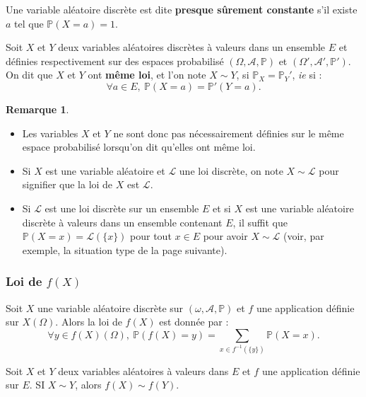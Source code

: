 \documentclass[french]{article}
\renewcommand{\P}{\mathbb{P}}
\newcommand{\inv}{^{-1}}
\theoremstyle{plain}
\theoremstyle{definition}
\newtheorem*{rmq}{Remarque}
\theoremstyle{remark}
\begin{document}
\begin{dfn}
	Une variable aléatoire discrète est dite \textbf{presque sûrement constante} s'il existe $a$ tel que $\P(X=a)=1$.
\end{dfn}

\begin{dfn}
	Soit $X$ et $Y$ deux variables aléatoires discrètes à valeurs dans un ensemble $E$ et définies respectivement sur des espaces probabilisé $(\Omega,\mathcal{A},\P)$ et $(\Omega',\mathcal{A}',\P')$.\\
	On dit que $X$ et $Y$ ont \textbf{même loi}, et l'on note $X\sim Y$, si $\P_X=\P_Y'$, \textit{ie} si :
	$$\forall a\in E,\ \P(X=a)=\P'(Y=a).$$
\end{dfn}

\begin{rmq}
	\begin{itemize}
		\item Les variables $X$ et $Y$ ne sont donc pas nécessairement définies sur le même espace probabilisé lorsqu'on dit qu'elles ont même loi.
		\item Si $X$ est une variable aléatoire et $\mathcal{L}$ une loi discrète, on note $X\sim\mathcal{L}$ pour signifier que la loi de $X$ est $\mathcal{L}$.
		\item Si $\mathcal{L}$ est une loi discrète sur un ensemble $E$ et si $X$ est une variable aléatoire discrète à valeurs dans un ensemble contenant $E$, il suffit que $\P(X=x)=\mathcal{L}(\{x\})$ pour tout $x\in E$ pour avoir $X\sim\mathcal{L}$ (voir, par exemple, la situation type de la page suivante).
	\end{itemize}
\end{rmq}

\subsubsection*{Loi de $f(X)$}

\begin{prop}%
	Soit $X$ une variable aléatoire discrète sur $(\omega,\mathcal{A},\P)$ et $f$ une application définie sur $X(\Omega)$. Alors la loi de $f(X)$ est donnée par :
	$$\forall y\in f(X)(\Omega),\ \P(f(X)=y)=\sum_{x\in f\inv(\{y\})}\P(X=x).$$
\end{prop}

\begin{prop}%
	Soit $X$ et $Y$ deux variables aléatoires à valeurs dans $E$ et $f$ une application définie sur $E$. SI $X\sim Y$, alors $f(X)\sim f(Y)$.
\end{prop}
\end{document}
